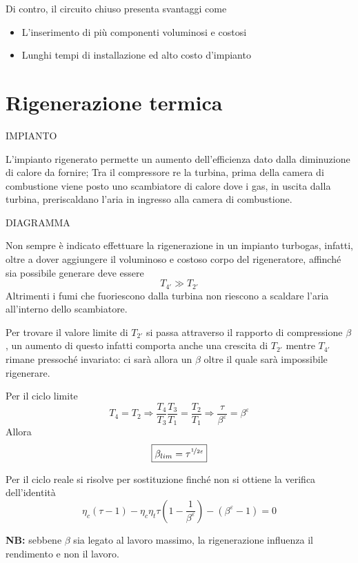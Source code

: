 \begin{adjustwidth}{2in}{}
	\vspace{0.5cm}
	
	Di contro, il circuito chiuso presenta svantaggi come 
	\begin{itemize}
		\item L'inserimento di più componenti voluminosi e costosi
		\item Lunghi tempi di installazione ed alto costo d'impianto
	\end{itemize}
	
\end{adjustwidth}




\section{Rigenerazione termica}
\begin{adjustwidth}{2in}{}	
	
	IMPIANTO
	
	L'impianto rigenerato permette un aumento dell'efficienza dato dalla diminuzione di calore da fornire; Tra il compressore re la turbina, prima della camera di combustione viene posto uno scambiatore di calore dove i gas, in uscita dalla turbina, preriscaldano l'aria in ingresso alla camera di combustione. 
	
	DIAGRAMMA 
	
	Non sempre è indicato effettuare la rigenerazione in un impianto turbogas, infatti, oltre a dover aggiungere il voluminoso e costoso corpo del rigeneratore, affinché sia possibile generare deve essere 
	\[T_{4'}\gg T_{2'}\]
	Altrimenti i fumi che fuoriescono dalla turbina non riescono a scaldare l'aria all'interno dello scambiatore. \newline 
	
	Per trovare il valore limite di $T_{2'}$ si passa attraverso il rapporto di compressione $\beta$, un aumento di questo infatti comporta anche una crescita di $T_{2'}$ mentre $T_{4'}$ rimane pressoché invariato: ci sarà allora un $\beta$ oltre il quale sarà impossibile rigenerare. \newline 
	
	Per il ciclo limite 
	\[T_4 = T_2 \Rightarrow \dfrac{T_4}{T_3}\dfrac{T_3}{T_1} = \dfrac{T_2}{T_1} \Rightarrow \dfrac{\tau}{\beta^\varepsilon}=\beta^\varepsilon\]
	Allora 
	\begin{equation}\label{eq:2.5}
		\boxed{\beta_{lim} = \tau^{\nicefrac{1}{2\varepsilon}}}
	\end{equation}  
	
	Per il ciclo reale si risolve per sostituzione finché non si ottiene la verifica dell'identità
	\begin{equation}\label{eq:2.6}
		\boxed{\eta_c(\tau-1) - \eta_c\eta_t\tau(1-\dfrac{1}{\beta^\varepsilon}) - (\beta^\varepsilon-1) = 0}
	\end{equation}
	
	\textbf{NB:} sebbene $\beta$ sia legato al lavoro massimo, la rigenerazione influenza il rendimento e non il lavoro. 	
\end{adjustwidth}





